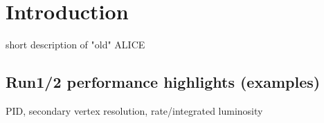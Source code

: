 \section{Introduction}
short description of "old" ALICE
\subsection{Run1/2 performance highlights (examples)}
PID, secondary vertex resolution, rate/integrated luminosity
